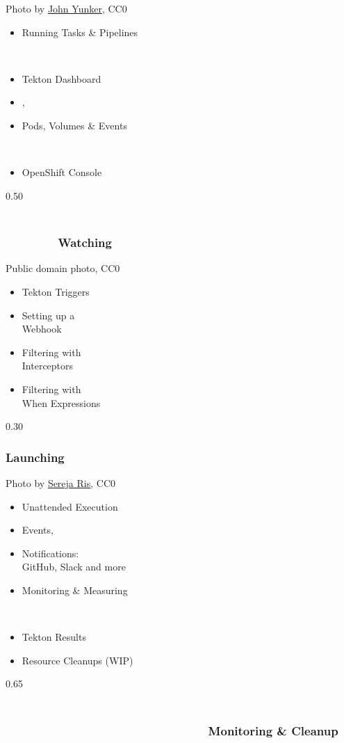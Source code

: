 \documentclass[aspectratio=169,11pt,hyperref={colorlinks=true}]{beamer}
\begin{document}
\begin{lpicrblack}{%
  Photo by \href{https://unsplash.com/@jyunker}{\underline{John Yunker}}, CC0
  }%
  {%
  \begin{itemize}
    \item Running Tasks \& Pipelines
  \end{itemize}
  ~\\
  \begin{itemize}
    \item Tekton Dashboard
    \item {}, 
    \item Pods, Volumes \& Events
  \end{itemize}
  ~
  \begin{itemize}
    \item OpenShift Console
  \end{itemize}
  }%
  {0.50}%
  \frametitle{~~~~~~~~~~~~~~~~~~~~~~~~~~~~~~~~~~~~~~~~~~~~~~~~~~~~~~~~~~~~~Watching}
\end{lpicrblack}


\begin{lgrayframerpic}{Public domain photo, CC0}%
  {%
  \begin{itemize}
    \item Tekton Triggers
    \item Setting up a\\Webhook
    \item Filtering with\\Interceptors
    \item Filtering with\\When Expressions
  \end{itemize}
  }%
  {0.30}
  \frametitle{Launching}
\end{lgrayframerpic}

\begin{lpicrblack}{%
  Photo by \href{https://unsplash.com/@serejaris}{\underline{Sereja Ris}}, CC0
  }%
  {%
  \begin{itemize}
    \item Unattended Execution
    \item Events, 
    \item Notifications:\\GitHub, Slack and more
    \item Monitoring \& Measuring
  \end{itemize}
  ~\\
  \begin{itemize}
    \item Tekton Results
    \item Resource Cleanups (WIP)
  \end{itemize}
  }%
  {0.65}%
  \frametitle{~~~~~~~~~~~~~~~~~~~~~~~~~~~~~~~~~~~~~~~~~~~~~~~~~~~~~~~~~~~~~~~~~~~~~~~~~~~~~~~~~~~~Monitoring \& Cleanup}
\end{lpicrblack}
\end{document}
